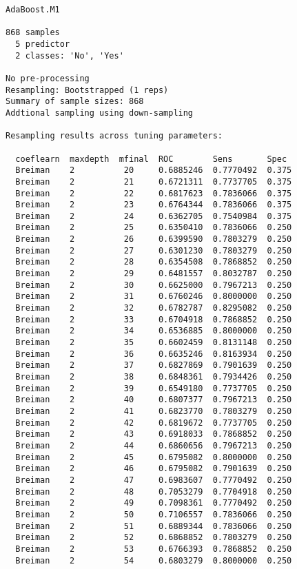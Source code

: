\documentclass[11pt]{article}
\begin{document}
    \begin{Verbatim}[commandchars=\\\{\}]
AdaBoost.M1 

868 samples
  5 predictor
  2 classes: 'No', 'Yes' 

No pre-processing
Resampling: Bootstrapped (1 reps) 
Summary of sample sizes: 868 
Addtional sampling using down-sampling

Resampling results across tuning parameters:

  coeflearn  maxdepth  mfinal  ROC        Sens       Spec 
  Breiman    2          20     0.6885246  0.7770492  0.375
  Breiman    2          21     0.6721311  0.7737705  0.375
  Breiman    2          22     0.6817623  0.7836066  0.375
  Breiman    2          23     0.6764344  0.7836066  0.375
  Breiman    2          24     0.6362705  0.7540984  0.375
  Breiman    2          25     0.6350410  0.7836066  0.250
  Breiman    2          26     0.6399590  0.7803279  0.250
  Breiman    2          27     0.6301230  0.7803279  0.250
  Breiman    2          28     0.6354508  0.7868852  0.250
  Breiman    2          29     0.6481557  0.8032787  0.250
  Breiman    2          30     0.6625000  0.7967213  0.250
  Breiman    2          31     0.6760246  0.8000000  0.250
  Breiman    2          32     0.6782787  0.8295082  0.250
  Breiman    2          33     0.6704918  0.7868852  0.250
  Breiman    2          34     0.6536885  0.8000000  0.250
  Breiman    2          35     0.6602459  0.8131148  0.250
  Breiman    2          36     0.6635246  0.8163934  0.250
  Breiman    2          37     0.6827869  0.7901639  0.250
  Breiman    2          38     0.6848361  0.7934426  0.250
  Breiman    2          39     0.6549180  0.7737705  0.250
  Breiman    2          40     0.6807377  0.7967213  0.250
  Breiman    2          41     0.6823770  0.7803279  0.250
  Breiman    2          42     0.6819672  0.7737705  0.250
  Breiman    2          43     0.6918033  0.7868852  0.250
  Breiman    2          44     0.6860656  0.7967213  0.250
  Breiman    2          45     0.6795082  0.8000000  0.250
  Breiman    2          46     0.6795082  0.7901639  0.250
  Breiman    2          47     0.6983607  0.7770492  0.250
  Breiman    2          48     0.7053279  0.7704918  0.250
  Breiman    2          49     0.7098361  0.7770492  0.250
  Breiman    2          50     0.7106557  0.7836066  0.250
  Breiman    2          51     0.6889344  0.7836066  0.250
  Breiman    2          52     0.6868852  0.7803279  0.250
  Breiman    2          53     0.6766393  0.7868852  0.250
  Breiman    2          54     0.6803279  0.8000000  0.250

\end{Verbatim}
\end{document}
